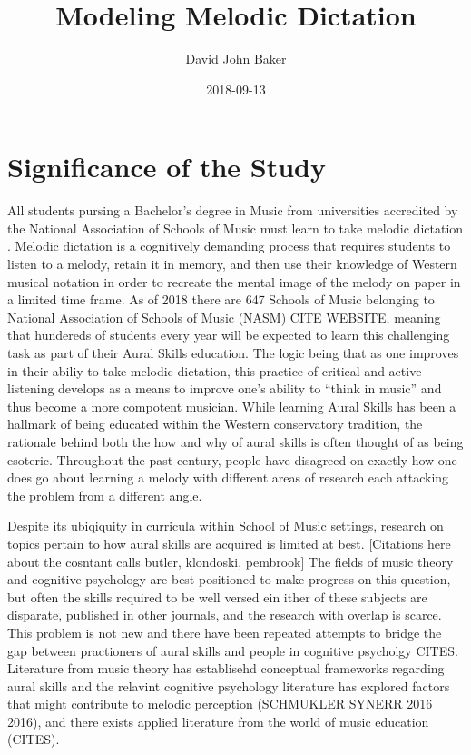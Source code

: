 \documentclass[]{book}
\title{Modeling Melodic Dictation}
\author{David John Baker}
\date{2018-09-13}
\theoremstyle{definition}
\theoremstyle{definition}
\theoremstyle{definition}
\theoremstyle{remark}
\begin{document}
\maketitle

{
\setcounter{tocdepth}{1}
\tableofcontents
}
\hypertarget{significance-of-the-study}{%
\chapter{Significance of the Study}\label{significance-of-the-study}}

All students pursing a Bachelor's degree in Music from universities
accredited by the National Association of Schools of Music must learn to
take melodic dictation \citep[ Section
VIII.6.B.2.A]{NationalAssociationSchools2018}. Melodic dictation is a
cognitively demanding process that requires students to listen to a
melody, retain it in memory, and then use their knowledge of Western
musical notation in order to recreate the mental image of the melody on
paper in a limited time frame. As of 2018 there are 647 Schools of Music
belonging to National Association of Schools of Music (NASM) CITE
WEBSITE, meaning that hundereds of students every year will be expected
to learn this challenging task as part of their Aural Skills education.
The logic being that as one improves in their abiliy to take melodic
dictation, this practice of critical and active listening develops as a
means to improve one's ability to ``think in music'' and thus become a
more compotent musician. While learning Aural Skills has been a hallmark
of being educated within the Western conservatory tradition, the
rationale behind both the how and why of aural skills is often thought
of as being esoteric. Throughout the past century, people have disagreed
on exactly how one does go about learning a melody with different areas
of research each attacking the problem from a different angle.

Despite its ubiqiquity in curricula within School of Music settings,
research on topics pertain to how aural skills are acquired is limited
at best. {[}Citations here about the cosntant calls butler, klondoski,
pembrook{]} The fields of music theory and cognitive psychology are best
positioned to make progress on this question, but often the skills
required to be well versed ein ither of these subjects are disparate,
published in other journals, and the research with overlap is scarce.
This problem is not new and there have been repeated attempts to bridge
the gap between practioners of aural skills and people in cognitive
psycholgy CITES. Literature from music theory has establisehd conceptual
frameworks regarding aural skills
\citet{karpinskiAuralSkillsAcquisition2000} and the relavint cognitive
psychology literature has explored factors that might contribute to
melodic perception (SCHMUKLER SYNERR 2016 2016), and there exists
applied literature from the world of music education (CITES).
\end{document}
